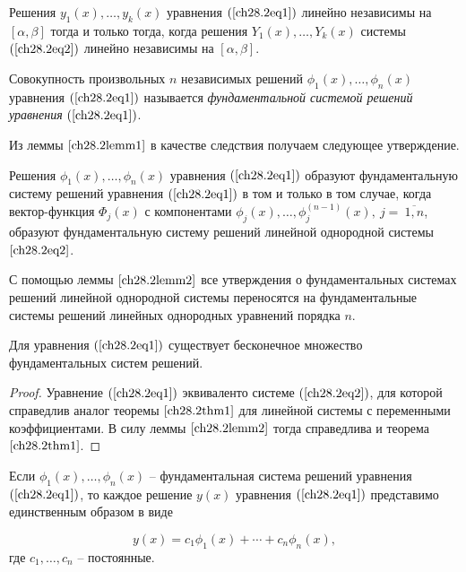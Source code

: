 \begin{cons}
Решения $y_1(x), \ldots, y_k(x)$ уравнения $(\ref{ch28.2eq1})$ линейно независимы на $[\alpha, \beta]$ тогда и только тогда, когда решения $Y_1(x), \ldots, Y_k(x)$ системы $(\ref{ch28.2eq2})$ линейно независимы на $[\alpha, \beta]$.
\end{cons}

\begin{defn}
Совокупность произвольных $n$ независимых решений $\phi_1(x), \ldots, \phi_n(x)$ уравнения $(\ref{ch28.2eq1})$ называется \textit{фундаментальной системой решений уравнения} $(\ref{ch28.2eq1})$.
\end{defn}

Из леммы $\ref{ch28.2lemm1}$ в качестве следствия получаем следующее утверждение.

\begin{lemm} \label{ch28.2lemm2}
Решения $\phi_1(x), \ldots, \phi_n(x)$ уравнения $(\ref{ch28.2eq1})$ образуют фундаментальную систему решений уравнения $(\ref{ch28.2eq1})$ в том и только в том случае, когда вектор-функция $\Phi_j(x)$ с компонентами $\phi_j(x), \ldots, \phi^{(n - 1)}_j(x),\ j =\ \overline{1,n}$, образуют фундаментальную систему решений линейной однородной системы $\eqref{ch28.2eq2}$.
\end{lemm}

С помощью леммы $\ref{ch28.2lemm2}$ все утверждения о фундаментальных системах решений линейной однородной системы переносятся на фундаментальные системы решений линейных однородных уравнений порядка $n$.

\begin{thm} \label{ch28.2thm1}
Для уравнения $(\ref{ch28.2eq1})$ существует бесконечное множество фундаментальных систем решений.
\end{thm}

\begin{proof}
Уравнение $(\ref{ch28.2eq1})$ эквиваленто системе $(\ref{ch28.2eq2})$, для которой справедлив аналог теоремы $\ref{ch28.2thm1}$ для линейной системы с переменными коэффициентами. В силу леммы $\ref{ch28.2lemm2}$ тогда справедлива и теорема $\ref{ch28.2thm1}$.
\end{proof}

\begin{thm} \label{ch28.2thm2}
Если $\phi_1(x), \ldots, \phi_n(x)$ -- фундаментальная система решений уравнения $(\ref{ch28.2eq1})$, то каждое решение $y(x)$ уравнения $(\ref{ch28.2eq1})$ представимо единственным образом в виде

$$
y(x) = c_1\phi_1(x) + \cdots + c_n\phi_n(x),
$$
где $c_1, \ldots, c_n$ -- постоянные.
\end{thm}

